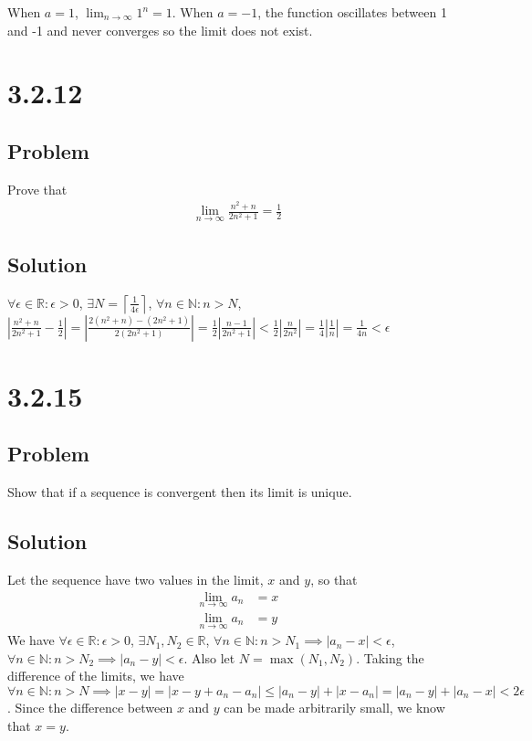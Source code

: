 \documentclass[12pt]{article}
\newcommand{\abs}  [1]{\left|       #1 \right|      }
\newcommand{\ceil} [1]{\left\lceil  #1 \right\rceil }
\newcommand{\R}    [0]{\mathbb{R}                   }
\newcommand{\N}    [0]{\mathbb{N}                   }
\begin{document}
When $a = 1$, $\lim_{n \to \infty} 1^n = 1$. When $a = -1$, the function oscillates between 1 and -1 and never converges so the limit does not exist.



\section*{3.2.12}

\subsection*{Problem}
Prove that
\begin{align*}
    \lim_{n \to \infty} \frac{n^2 + n}{2n^2 + 1} = \frac{1}{2}
\end{align*}

\subsection*{Solution}
$\forall \epsilon \in \R : \epsilon > 0$, $\exists N = \ceil{\frac{1}{4 \epsilon}}$, $\forall n \in \N : n > N$, $\abs{\frac{n^2 + n}{2n^2 + 1} - \frac{1}{2}} = \abs{\frac{2(n^2 + n) - (2n^2 + 1)}{2(2n^2 + 1)}} = \frac{1}{2} \abs{\frac{n - 1}{2n^2 + 1}} < \frac{1}{2} \abs{\frac{n}{2n^2}} = \frac{1}{4} \abs{\frac{1}{n}} = \frac{1}{4n} < \epsilon$



\section*{3.2.15}

\subsection*{Problem}
Show that if a sequence is convergent then its limit is unique.

\subsection*{Solution}
Let the sequence have two values in the limit, $x$ and $y$, so that
\begin{align*}
    \lim_{n \to \infty} a_n &= x \\
    \lim_{n \to \infty} a_n &= y
\end{align*}
 We have $\forall \epsilon \in \R : \epsilon > 0$, $\exists N_1, N_2 \in \R$, $\forall n \in \N : n > N_1 \implies \abs{a_n - x} < \epsilon$, $\forall n \in \N : n > N_2 \implies \abs{a_n - y} < \epsilon$. Also let $N = \max(N_1, N_2)$. Taking the difference of the limits, we have $\forall n \in \N : n > N \implies \abs{x - y} = \abs{x - y + a_n - a_n} \leq \abs{a_n - y} + \abs{x - a_n} = \abs{a_n - y} + \abs{a_n - x} < 2 \epsilon$. Since the difference between $x$ and $y$ can be made arbitrarily small, we know that $x = y$.
\end{document}
